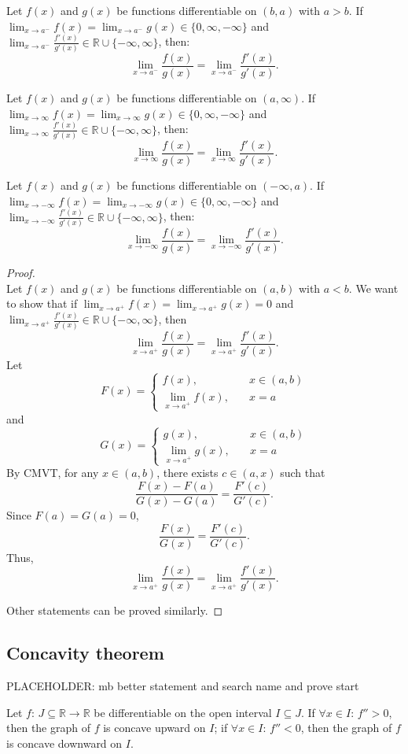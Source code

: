 \documentclass[a4paper,12pt]{report}
\begin{document}
\begin{itemize}
\begin{itemize}
Let $f(x)$ and $g(x)$ be functions differentiable on $(b,a)$ with $a>b$. If $\lim_{x\to a^-}f(x)=\lim_{x\to a^-}g(x)\in\{0,\infty,-\infty\}$ and $\lim_{x\to a^-}\frac{f'(x)}{g'(x)}\in\mathbb{R}\cup\{-\infty,\infty\}$, then:
\[\lim_{x\to a^-}\frac{f(x)}{g(x)}=\lim_{x\to a^-}\frac{f'(x)}{g'(x)}.\]

Let $f(x)$ and $g(x)$ be functions differentiable on $(a,\infty)$. If $\lim_{x\to\infty}f(x)=\lim_{x\to\infty}g(x)\in\{0,\infty,-\infty\}$ and $\lim_{x\to\infty}\frac{f'(x)}{g'(x)}\in\mathbb{R}\cup\{-\infty,\infty\}$, then:
\[\lim_{x\to\infty}\frac{f(x)}{g(x)}=\lim_{x\to\infty}\frac{f'(x)}{g'(x)}.\]

Let $f(x)$ and $g(x)$ be functions differentiable on $(-\infty,a)$. If $\lim_{x\to-\infty}f(x)=\lim_{x\to-\infty}g(x)\in\{0,\infty,-\infty\}$ and $\lim_{x\to-\infty}\frac{f'(x)}{g'(x)}\in\mathbb{R}\cup\{-\infty,\infty\}$, then:
\[\lim_{x\to-\infty}\frac{f(x)}{g(x)}=\lim_{x\to-\infty}\frac{f'(x)}{g'(x)}.\]
\begin{proof}\mbox{}\\
Let $f(x)$ and $g(x)$ be functions differentiable on $(a,b)$ with $a<b$. We want to show that if $\lim_{x\to a^+}f(x)=\lim_{x\to a^+}g(x)=0$ and $\lim_{x\to a^+}\frac{f'(x)}{g'(x)}\in\mathbb{R}\cup\{-\infty,\infty\}$, then
\[\lim_{x\to a^+}\frac{f(x)}{g(x)}=\lim_{x\to a^+}\frac{f'(x)}{g'(x)}.\]
Let
\[F(x)=\begin{cases}f(x),\quad & x\in (a,b)\\
\lim_{x\to a^+}f(x),\quad & x=a\end{cases}\]
and
\[G(x)=\begin{cases}g(x),\quad & x\in (a,b)\\
\lim_{x\to a^+}g(x),\quad & x=a\end{cases}\]
By CMVT, for any $x\in (a,b)$, there exists $c\in (a,x)$ such that
\[\frac{F(x)-F(a)}{G(x)-G(a)}=\frac{F'(c)}{G'(c)}.\]
Since $F(a)=G(a)=0$,
\[\frac{F(x)}{G(x)}=\frac{F'(c)}{G'(c)}.\]
Thus,
\[\lim_{x\to a^+}\frac{f(x)}{g(x)}=\lim_{x\to a^+}\frac{f'(x)}{g'(x)}.\]

Other statements can be proved similarly.
\end{proof}
\subsection{Concavity theorem}
PLACEHOLDER: mb better statement and search name and prove start

Let $f:\,J\subseteq\mathbb{R}\to\mathbb{R}$ be differentiable on the open interval $I\subseteq J$. If $\forall x\in I:\,f''>0$, then the graph of $f$ is concave upward on $I$; if $\forall x\in I:\,f''<0$, then the graph of $f$ is concave downward on $I$.

\end{itemize}
\end{itemize}
\end{document}
